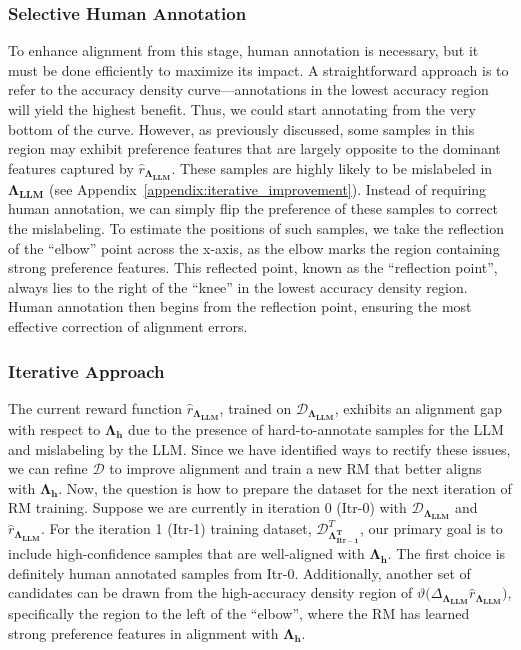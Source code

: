 \subsubsection{Selective Human Annotation}
To enhance alignment from this stage, human annotation is necessary, but it must be done efficiently to maximize its impact. A straightforward approach is to refer to the accuracy density curve—annotations in the lowest accuracy region will yield the highest benefit. Thus, we could start annotating from the very bottom of the curve. However, as previously discussed, some samples in this region may exhibit preference features that are largely opposite to the dominant features captured by $\hat{r}_\mathbf{\Lambda_{LLM}}$. These samples are highly likely to be mislabeled in $\mathbf{\Lambda_{LLM}}$ (see Appendix~\ref{appendix:iterative_improvement}). Instead of requiring human annotation, we can simply flip the preference of these samples to correct the mislabeling. To estimate the positions of such samples, we take the reflection of the ``elbow'' point across the x-axis, as the elbow marks the region containing strong preference features. This reflected point, known as the ``reflection point'', always lies to the right of the ``knee'' in the lowest accuracy density region. Human annotation then begins from the reflection point, ensuring the most effective correction of alignment errors.

\subsubsection{Iterative Approach}
\label{sec:design:improve:iter}
The current reward function $\hat{r}_\mathbf{\Lambda_{LLM}}$, trained on $\mathcal{D}_{\mathbf{\Lambda_{LLM}}}$, exhibits an alignment gap with respect to $\mathbf{\Lambda_{h}}$ due to the presence of hard-to-annotate samples for the LLM and mislabeling by the LLM. Since we have identified ways to rectify these issues, we can refine $\mathcal{D}$ to improve alignment and train a new RM that better aligns with $\mathbf{\Lambda_{h}}$. Now, the question is how to prepare the dataset for the next iteration of RM training. Suppose we are currently in iteration 0 (Itr-0) with $\mathcal{D}_{\mathbf{\Lambda_{LLM}}}$ and $\hat{r}_\mathbf{\Lambda_{LLM}}$. For the iteration 1 (Itr-1) training dataset, $\mathcal{D}_{\mathbf{\Lambda_{Itr-1}^{T}}}^{T}$, our primary goal is to include high-confidence samples that are well-aligned with $\mathbf{\Lambda_{h}}$. The first choice is definitely human annotated samples from Itr-0.  Additionally, another set of candidates can be drawn from the high-accuracy density region of $\vartheta(\Delta_{\mathbf{\Lambda_{LLM}}}{\hat{r}_\mathbf{\Lambda_{LLM}})}$, specifically the region to the left of the ``elbow'', where the RM has learned strong preference features in alignment with $\mathbf{\Lambda_{h}}$.

